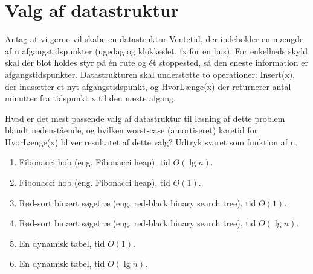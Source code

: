 \documentclass[12pt,a4paper]{article}
\begin{document}
\section{Valg af datastruktur}

Antag at vi gerne vil skabe en datastruktur Ventetid, der indeholder en mængde af n afgangstidspunkter (ugedag og klokkeslet, fx for en bus). For enkelheds skyld skal der blot holdes styr på én rute og ét stoppested, så den eneste information er afgangstidspunkter. Datastrukturen skal understøtte to operationer: Insert(x), der indsætter et nyt afgangstidspunkt, og HvorLænge(x) der returnerer antal minutter fra tidspunkt x til den næste afgang.

Hvad er det mest passende valg af datastruktur til løsning af dette problem blandt nedenstående, og hvilken worst-case (amortiseret) køretid for HvorLænge(x) bliver resultatet af dette valg? Udtryk svaret som funktion af n.

\begin{enumerate}
    \item Fibonacci hob (eng. Fibonacci heap), tid $O(\lg n)$.
    \item Fibonacci hob (eng. Fibonacci heap), tid $O(1)$.
    \item Rød-sort binært søgetræ (eng. red-black binary search tree), tid $O(1)$.
    \item Rød-sort binært søgetræ (eng. red-black binary search tree), tid $O(\lg n)$.
    \item En dynamisk tabel, tid $O(1)$.
    \item En dynamisk tabel, tid $O(\lg n)$.
\end{enumerate}
\end{document}
